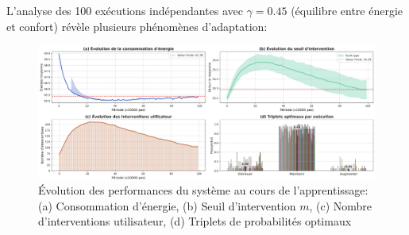 \documentclass[a4paper,11pt]{article}
\begin{document}
L'analyse des 100 exécutions indépendantes avec $\gamma=0.45$ (équilibre entre énergie et confort) révèle plusieurs phénomènes d'adaptation:

\begin{figure}[h]
    \centering
    \includegraphics[width=1\textwidth]{figures/evolution_triplets_optimo.png}
    \caption{Évolution des performances du système au cours de l'apprentissage: (a) Consommation d'énergie, (b) Seuil d'intervention $m$, (c) Nombre d'interventions utilisateur, (d) Triplets de probabilités optimaux}
    \label{fig:evolution_triplets}
\end{figure}
\end{document}
